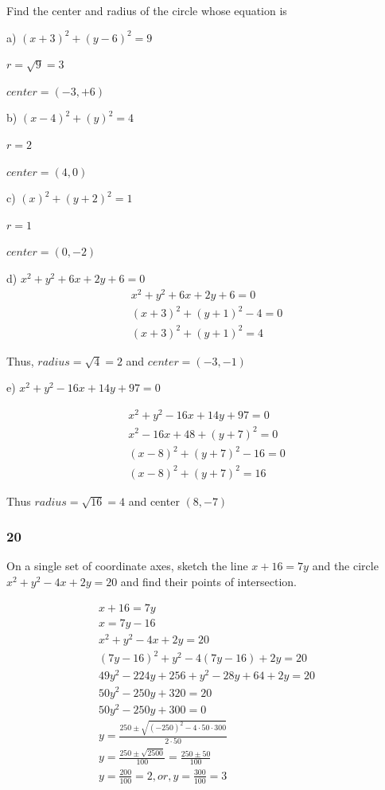 \documentclass[]{report}
\begin{document}
Find the center and radius of the circle whose equation is

a) $(x + 3)^2 + (y - 6) ^2 = 9$

$r = \sqrt{9} = 3$

$center = (-3, +6)$


b) $(x - 4)^2 + (y) ^2 = 4$

$r = 2$

$center = (4, 0)$


c) $(x )^2 + (y + 2) ^2 = 1$

$r = 1$

$center = (0, -2)$


d) $x^2 + y^2 + 6x + 2y + 6  = 0$
\begin{align*}
	x^2 + y^2 + 6x + 2y + 6  = 0 \tag{1} \\
	(x + 3)^2 + (y+1)^2  -4 = 0  \tag{factoring out x and y} \\
	(x + 3)^2 + (y+1)^2 = 4
\end{align*}

Thus, $radius = \sqrt{4} = 2$ and $center = (-3, -1)$

e) $x^2 + y^2 - 16x + 14y + 97 = 0$

\begin{align*}
x^2 + y^2 - 16x + 14y + 97 = 0	\tag{1} \\
x^2 - 16x + 48 + (y + 7)^2 = 0 \tag{factoring out y}\\
(x-8)^2 + (y+7)^2 - 16 = 0 \tag{factoring out x} \\
(x-8)^2 + (y+7)^2 = 16
\end{align*}

Thus $radius = \sqrt{16} = 4$ and center $(8, -7)$

\subsubsection{20}

On a single set of coordinate axes, sketch the line $x + 16 = 7y$ and the circle $x^2 + y^2 - 4x + 2y = 20$ and find their points of intersection.

\begin{align*}
	x + 16 = 7y \tag{1} \\
	x = 7y - 16 \tag{rearranging} \\
	x^2 + y^2 - 4x + 2y = 20  \tag{2} \\
	(7y - 16)^2 + y^2 - 4(7y -16) + 2y = 20 \tag{eliminating x} \\
	49y^2 - 224y + 256 + y^2 - 28y  + 64 + 2y = 20 \tag{expanding} \\
	50y^2 - 250y + 320 = 20 \\
	50y^2 - 250y + 300 = 0 \\
	y = \frac{250 \pm \sqrt{(-250)^2 - 4 \cdot 50 \cdot 300}}{2 \cdot 50} \\
	y = \frac{250 \pm \sqrt{2500}}{100} = \frac{250 \pm 50}{100}\\
	y = \frac{200}{100} = 2, or, y = \frac{300}{100} = 3
\end{align*}
\end{document}
